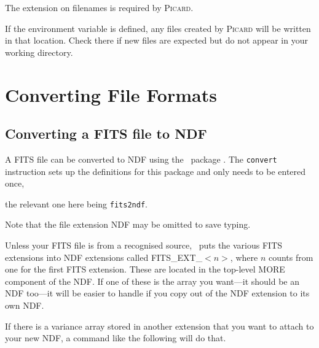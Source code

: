 \documentclass[11pt,oneside,chapters]{starlink}
\begin{document}
\begin{tip}
The  extension on filenames is required by \textsc{Picard}.
\end{tip}

\begin{tip}
If the environment variable  is defined, any files
created by \textsc{Picard} will be written in that location. Check there if new
files are expected but do not appear in your working directory.
\end{tip}

\newpage
\chapter{Converting File Formats}
\label{app:convert}

\section{Converting a FITS file to NDF}

A FITS file can be converted to NDF using the \starlink\ package
\convert.  The \texttt{convert} instruction sets up the definitions
for this package and only needs to be entered once,

\begin{terminalv}
\end{terminalv}

the relevant one here being \texttt{fits2ndf}.

\begin{terminalv}
\end{terminalv}

Note that the  file extension NDF may be omitted to save
typing.

Unless your FITS file is from a recognised source, \fitstondf\ puts the
various FITS extensions into NDF extensions called FITS\_EXT\_$<\!n\!>$,
where $n$ counts from one for the first FITS extension. These are
located in the top-level MORE component of the NDF. If one of these is
the array you want---it should be an NDF too---it will be easier to
handle if you copy out of the NDF extension to its own NDF.

\begin{terminalv}
\end{terminalv}

If there is a variance array stored in another extension that you want
to attach to your new NDF, a command like the following will do that.
\end{document}
